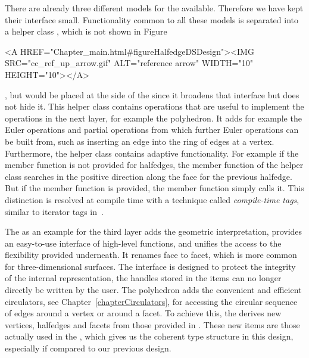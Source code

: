 There are already three different models for the
 available. Therefore we have kept their
interface small. Functionality common to all these models is separated
into a helper class , which is
not shown in 
Figure~\ccTexHtml{\ref{figureHalfedgeDSDesign}}{}\begin{ccHtmlOnly}
  <A HREF="Chapter_main.html#figureHalfedgeDSDesign"><IMG 
  SRC="cc_ref_up_arrow.gif" ALT="reference arrow" WIDTH="10" HEIGHT="10"></A>
\end{ccHtmlOnly}, but would be placed at the
side of the  since it broadens that
interface but does not hide it.  This helper class contains operations
that are useful to implement the operations in the next layer, for
example the polyhedron. It adds for example the Euler operations and
partial operations from which further Euler operations can be built
from, such as inserting an edge into the ring of edges at a vertex.
Furthermore, the helper class contains adaptive functionality.  For
example if the  member function is not provided for
halfedges, the  member function of the helper class
searches in the positive direction along the face for the previous
halfedge. But if the  member function is provided, the
 member function simply calls it. This distinction
is resolved at compile time with a technique called {\em
  compile-time tags}, similar to iterator tags in~\cite{sl-stl-95}.

The  as an example for the third layer adds the
geometric interpretation, provides an easy-to-use interface of
high-level functions, and unifies the access to the flexibility
provided underneath.  It renames face to facet, which is more common
for three-dimensional surfaces.  The interface is designed to protect
the integrity of the internal representation, the handles stored in
the items can no longer directly be written by the user.  The
polyhedron adds the convenient and efficient circulators, see
Chapter~\ref{chapterCirculators}, for accessing the circular sequence
of edges around a vertex or around a facet. To achieve this, the
 derives new vertices, halfedges and facets from those
provided in .  These new items are those actually used in
the , which gives us the coherent type
structure in this design, especially if compared to our previous
design.


\clearpage
